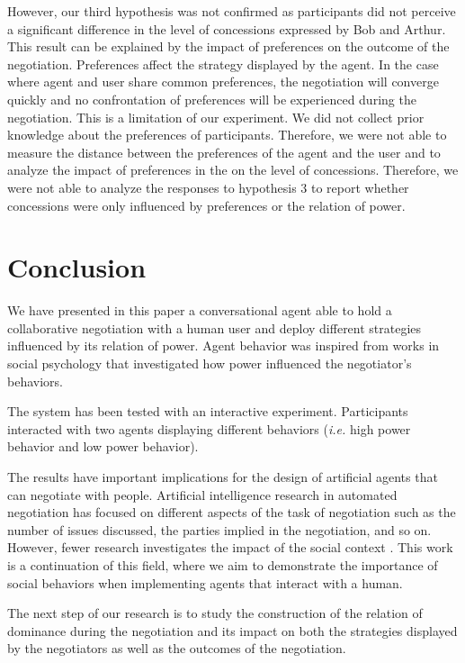 \documentclass[runningheads,a4paper]{llncs}
\begin{document}
	However, our third hypothesis was not confirmed as participants did not perceive a significant difference in the level of concessions expressed by Bob and Arthur. This result can be explained by the impact of preferences on the outcome of the negotiation. Preferences affect the strategy displayed by the agent. In the case where agent and user share common preferences, the negotiation will converge quickly and no confrontation of preferences will be experienced during the negotiation. This is a limitation of our experiment. We did not collect prior knowledge about the preferences of participants. Therefore, we were not able to measure the distance between the preferences of the agent and the user and to analyze the impact of preferences in the on the level of concessions.
	Therefore, we were not able to analyze the responses to hypothesis 3 to report whether concessions were only influenced by preferences or the relation of power.
	
	\section{Conclusion}
	
	We have presented in this paper a conversational agent able to hold a collaborative negotiation with a human user and deploy different strategies influenced by its relation of power. Agent behavior was inspired from works in social psychology that investigated how power influenced the negotiator's behaviors.
	
	The system has been tested with an interactive experiment. Participants interacted with two agents displaying different behaviors (\textit{i.e.} high power behavior and low power behavior).
	
	The results have important implications for the design of artificial agents that can negotiate with people. Artificial intelligence research in automated negotiation has focused on different aspects of the task of negotiation such as the number of issues discussed, the parties implied in the negotiation, and so on. However, fewer research investigates the impact of the social context \cite{de2011effect,nazari2015opponent}. This work is a continuation of this field, where we aim to demonstrate the importance of social behaviors when implementing agents that interact with a human. %
	
	The next step of our research is to study the construction of the relation of dominance during the negotiation and its impact on both the strategies displayed by the negotiators as well as the outcomes of the negotiation.
	
	
	\scriptsize{	
		
		}
	
\end{document}
